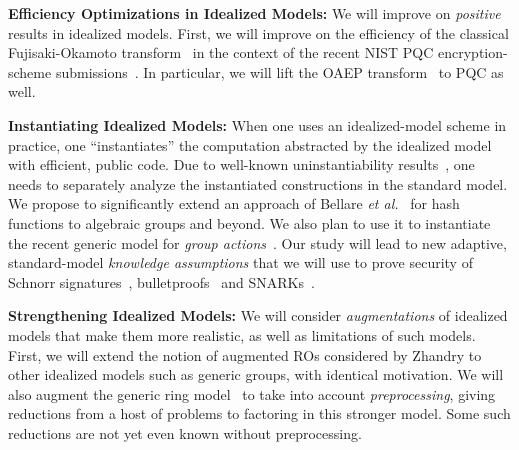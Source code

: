 \iffalse
\begin{newitemize}
\item \textbf{Efficiency Optimizations in Idealized Models:}  We will improve on \emph{positive} results in idealized models. First, we will improve on the efficiency of the classical Fujisaki-Okamoto transform~\cite{} in the context of the recent NIST PQC encryption-scheme submissions~\cite{}.  In particular, we will lift the OAEP transform~\cite{EC:BelRog94} to PQC as well.  

\item \textbf{Instantiating Idealized Models:}  When one uses an idealized-model scheme in practice, one ``instantiates'' the computation abstracted by the idealized model with efficient, public code.  Due to well-known uninstantiability results~\cite{}, one needs to separately analyze  the instantiated constructions in the standard model. We propose to significantly extend an approach of Bellare \emph{et al.}~\cite{C:BelHoaKee13} for hash functions to algebraic groups and beyond. We also plan to use it to instantiate the recent generic model for \emph{group actions}~\cite{}. Our study will lead to new  adaptive, standard-model \emph{knowledge assumptions} that we will use to prove security of Schnorr signatures~\cite{}, bulletproofs~\cite{} and  SNARKs~\cite{}. 

\item \textbf{Strengthening Idealized Models:} We will consider \emph{augmentations} of idealized models that make them more realistic, as well as limitations of such models.  First, we will extend the notion of augmented ROs considered by Zhandry to other idealized models such as generic groups, with identical motivation. We will also augment the generic ring model~\cite{} to take into account \emph{preprocessing}, giving reductions from a host of problems to factoring in this stronger model. Some such reductions are not yet even known without preprocessing. 


\end{newitemize}
